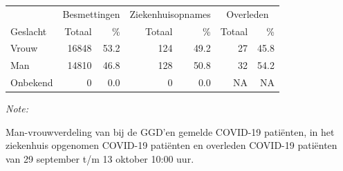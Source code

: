 \documentclass[
  english,
  man,floatsintext]{apa6}
\begin{document}
\begin{table}
\centering\begingroup\fontsize{11}{13}\selectfont

\begin{threeparttable}
\begin{tabular}{lrrrrrr}
\toprule
\multicolumn{1}{c}{ } & \multicolumn{2}{c}{Besmettingen} & \multicolumn{2}{c}{Ziekenhuisopnames} & \multicolumn{2}{c}{Overleden} \\
\cmidrule(l{3pt}r{3pt}){2-3} \cmidrule(l{3pt}r{3pt}){4-5} \cmidrule(l{3pt}r{3pt}){6-7}
Geslacht & Totaal & \% & Totaal & \% & Totaal & \%\\
\midrule
Vrouw & 16848 & 53.2 & 124 & 49.2 & 27 & 45.8\\
Man & 14810 & 46.8 & 128 & 50.8 & 32 & 54.2\\
Onbekend & 0 & 0.0 & 0 & 0.0 & NA & NA\\
\bottomrule
\end{tabular}
\begin{tablenotes}
\item \textit{Note: } 
\item Man-vrouwverdeling van bij de GGD’en gemelde COVID-19 patiënten, in het ziekenhuis opgenomen COVID-19 patiënten en overleden COVID-19 patiënten van 29 september t/m 13 oktober 10:00 uur.
\end{tablenotes}
\end{threeparttable}
\endgroup{}
\end{table}
\newpage
\end{document}
